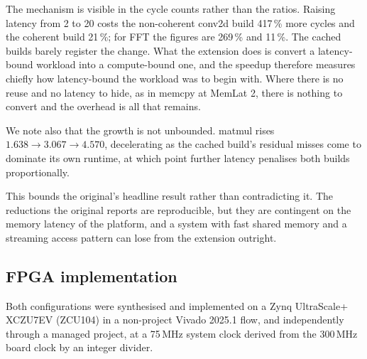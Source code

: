 \documentclass[conference]{IEEEtran}
\begin{document}
The mechanism is visible in the cycle counts rather than the ratios. Raising
latency from 2 to 20 costs the non-coherent conv2d build 417\,\% more cycles
and the coherent build 21\,\%; for FFT the figures are 269\,\% and 11\,\%. The
cached builds barely register the change. What the extension does is convert a
latency-bound workload into a compute-bound one, and the speedup therefore
measures chiefly how latency-bound the workload was to begin with. Where there
is no reuse and no latency to hide, as in memcpy at MemLat 2, there is nothing
to convert and the overhead is all that remains.

We note also that the growth is not unbounded. matmul rises $1.638 \rightarrow
3.067 \rightarrow 4.570$, decelerating as the cached build's residual misses
come to dominate its own runtime, at which point further latency penalises both
builds proportionally.

This bounds the original's headline result rather than contradicting it. The
reductions the original reports are reproducible, but they are contingent on the
memory latency of the platform, and a system with fast shared memory and a
streaming access pattern can lose from the extension outright.

\subsection{FPGA implementation}

Both configurations were synthesised and implemented on a Zynq UltraScale+
XCZU7EV (ZCU104) in a non-project Vivado 2025.1 flow, and independently through
a managed project, at a 75\,MHz system clock derived from the 300\,MHz board
clock by an integer divider.
\end{document}
